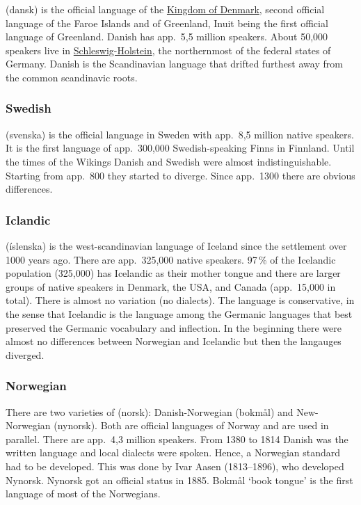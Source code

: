 (dansk) is the official language of the \href{https://en.wikipedia.org/wiki/Denmark}{Kingdom of Denmark}, second official language of the
Faroe Islands and of Greenland, Inuit being the first official language of
Greenland. Danish has app.\ 5,5 million speakers. About 50,000 speakers live in \href{https://en.wikipedia.org/wiki/Schleswig-Holstein}{Schleswig-Holstein}, the northernmost of the federal states of Germany.
Danish is the Scandinavian language that drifted furthest away from the common scandinavic roots.


\subsubsection{Swedish}

 (svenska) is the official language in Sweden with app.\ 8,5 million native speakers. It is
the first language of app.\ 300,000 Swedish-speaking Finns in Finnland. Until the times of the
Wikings Danish and Swedish were almost indistinguishable. Starting from app.\ 800 they started to
diverge. Since app.\ 1300 there are obvious differences.



\subsubsection{Iclandic}


 (íslenska) is the west-scandinavian language of Iceland since the settlement over 1000
years ago. 
There are app.\ 325,000 native speakers. 97\,\% of the Icelandic population (325,000) has Icelandic as their
mother tongue and there are larger groups of native speakers in Denmark, the USA, and Canada
(app.\ 15,000 in total). 
There is almost no variation (no dialects). The language is conservative, in the sense that Icelandic
is the language among the Germanic languages that best preserved the Germanic vocabulary and inflection.
In the beginning there were almost no differences between Norwegian and Icelandic but then the
langauges diverged.

\subsubsection{Norwegian}

There are two varieties of  (norsk): Danish-Norwegian (bokmål) and New-Norwegian (nynorsk). 
Both are official languages of Norway and are used in parallel. There are app.\ 4,3 million
speakers.
From 1380 to 1814 Danish was the written language and local dialects were spoken. Hence, a Norwegian
standard had to be developed. This was done by Ivar Aasen (1813--1896), who developed
Nynorsk. Nynorsk got an official status in 1885. Bokmål `book tongue' is the first language of most
of the Norwegians.

